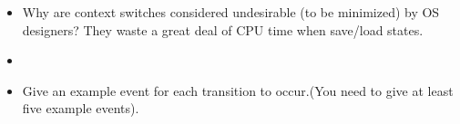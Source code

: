 \documentclass[fontsize=5pt]{scrartcl}
\begin{document}
\begin{multicols}{3}
\begin{itemize}
          \item Why are context switches considered undesirable (to be minimized) by OS designers? They waste a great deal of CPU time when save/load states.
          \item {}
          \item Give an example event for each transition to occur.(You need to
                give at least five example events).



      \end{itemize}
  \end{multicols}
\end{document}
